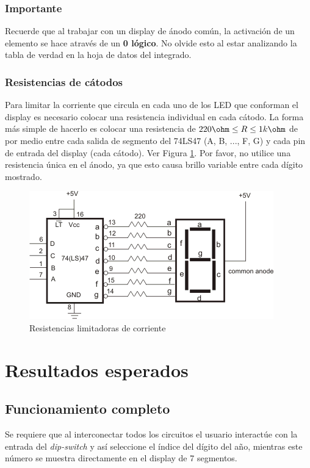 \subsubsection*{Importante}
Recuerde que al trabajar con un display de ánodo común, la activación de un elemento se hace através de un \textbf{0 lógico}. No olvide esto
al estar analizando la tabla de verdad en la hoja de datos del integrado.

\subsubsection{Resistencias de cátodos}
Para limitar la corriente que circula en cada uno de los LED que conforman el display es necesario colocar una resistencia individual en cada cátodo.
La forma más simple de hacerlo es colocar una resistencia de $ 220 \ohm \leq R \leq 1 k\ohm$ de por medio entre cada salida de segmento del 74LS47 (A, B, ..., F, G)
y cada pin de entrada del display (cada cátodo). Ver Figura \ref{Fig:Currentlimitingresistors}. Por favor, no utilice una resistencia única en el ánodo, ya que esto causa brillo variable entre cada 
dígito mostrado.

\begin{figure}[H]
    \centering
    \includegraphics[scale=1.0]{images/DisplayResistors.png}
    \caption{Resistencias limitadoras de corriente}
    \label{Fig:Currentlimitingresistors}
\end{figure}

\pagebreak

\section{Resultados esperados}
\subsection{Funcionamiento completo}
Se requiere que al interconectar todos los circuitos el usuario interactúe con la entrada del \emph{dip-switch} y así seleccione el índice del dígito del año, mientras
este número se muestra directamente en el display de 7 segmentos.

